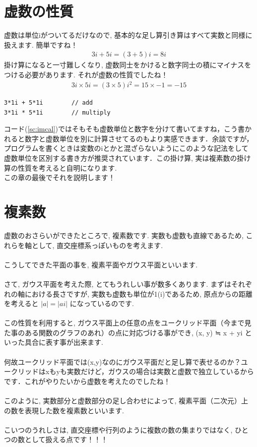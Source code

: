 \documentclass[11pt,a4paper,uplatex]{ujreport}
\begin{document}
\section{虚数の性質}
虚数は単位iがついてるだけなので, 基本的な足し算引き算はすべて実数と同様に扱えます. 簡単ですね！\\
\begin{eqnarray}
\label{eq:implus}
3i + 5i  =(3 + 5)i = 8i
\end{eqnarray}
掛け算になると一寸難しくなり, 虚数同士をかけると数字同士の積にマイナスをつける必要があります. それが虚数の性質でしたね！\\
\begin{eqnarray}
\label{eq:imkake}
3i \times 5i = (3\times 5)i^2 = 15 \times -1 = -15
\end{eqnarray}


\begin{lstlisting}[caption=式(\ref{eq:implus} \ref{eq:imkake})あたりのコード,label=sc:imcal , keepspaces=true]
3*1i + 5*1i        // add
3*1i * 5*1i        // multiply
\end{lstlisting}

コード(\ref{sc:imcal})ではそもそも虚数単位と数字を分けて書いてますね，こう書かれると数字と虚数単位を別に計算させてるのもより実感できます．余談ですが，プログラムを書くときは変数のiとかと混ざらないようにこのような記法をして虚数単位を区別する書き方が推奨されています．この掛け算, 実は複素数の掛け算の性質を考えると自明になります.\\
この章の最後でそれを説明します！\\
\section{複素数}
虚数のおさらいができたところで, 複素数です. 実数も虚数も直線であるため, これらを軸として, 直交座標系っぽいものを考えます.\\
\\
こうしてできた平面の事を, 複素平面やガウス平面といいます.\\
\\
さて, ガウス平面を考えた際, とてもうれしい事が数多くあります. まずはそれぞれの軸における長さですが, 実数も虚数も単位が1(i)であるため, 原点からの距離を考えると $ |a| = |ai| $ になっているのです. \\
\\
この性質を利用すると, ガウス平面上の任意の点をユークリッド平面（今まで見た事のある関数のグラフのあれ）の点に対応づける事ができ, (x, y) ≒ x + yi といった具合に表す事が出来ます. \\
\\
何故ユークリッド平面では(x,y)なのにガウス平面だと足し算で表せるのか？ユークリッドはxもyも実数だけど，ガウスの場合は実数と虚数で独立しているからです．これがやりたいから虚数を考えたのでしたね！\\
\\
このように, 実数部分と虚数部分の足し合わせによって, 複素平面（二次元）上の数を表現した数を複素数といいます.\\
\\
こいつのうれしさは, 直交座標や行列のように複数の数の集まりではなく, ひとつの数として扱える点です！！！\\
\end{document}
